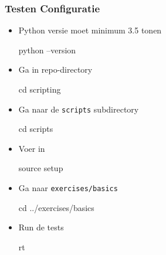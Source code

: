 \begin{frame}
  \frametitle{Testen Configuratie}
  \begin{itemize}
    \item Python versie moet minimum 3.5 tonen
          \begin{center} \ttfamily
            python --version
          \end{center}
    \item Ga in repo-directory
          \begin{center} \ttfamily
            cd scripting
          \end{center}
    \item Ga naar de \texttt{scripts} subdirectory
          \begin{center} \ttfamily
            cd scripts
          \end{center}
    \item Voer in
          \begin{center} \ttfamily
            source setup
          \end{center}
    \item Ga naar \texttt{exercises/basics}
          \begin{center} \ttfamily
            cd ../exercises/basics
          \end{center}
    \item Run de tests
          \begin{center} \ttfamily
            rt
          \end{center}
  \end{itemize}
\end{frame}

